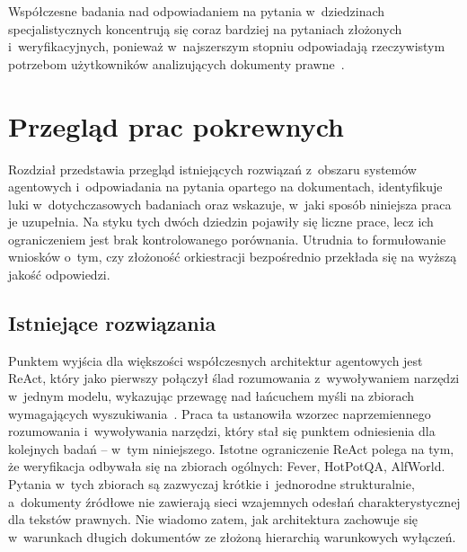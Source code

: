 Współczesne badania nad odpowiadaniem na pytania w~dziedzinach
specjalistycznych koncentrują się coraz bardziej na pytaniach złożonych
i~weryfikacyjnych, ponieważ w~najszerszym stopniu odpowiadają rzeczywistym
potrzebom użytkowników analizujących dokumenty
prawne~\cite{koreeda2021contractnli, yang2018hotpotqa}.

\section{Przegląd prac pokrewnych}\label{sec:przeglad-prac-pokrewnych}

Rozdział przedstawia przegląd istniejących rozwiązań z~obszaru systemów
agentowych i~odpowiadania na pytania opartego na dokumentach, identyfikuje luki
w~dotychczasowych badaniach oraz wskazuje, w~jaki sposób niniejsza praca je
uzupełnia. Na styku tych dwóch dziedzin pojawiły się liczne prace, lecz ich
ograniczeniem jest brak kontrolowanego porównania. Utrudnia to formułowanie
wniosków o~tym, czy złożoność orkiestracji bezpośrednio przekłada się na wyższą
jakość odpowiedzi.

\subsection{Istniejące rozwiązania}\label{subsec:istniejace-rozwiazania}

Punktem wyjścia dla większości współczesnych architektur agentowych jest ReAct,
który jako pierwszy połączył ślad rozumowania z~wywoływaniem narzędzi w~jednym
modelu, wykazując przewagę nad łańcuchem myśli na zbiorach wymagających
wyszukiwania~\cite{yao2022react}. Praca ta ustanowiła wzorzec naprzemiennego
rozumowania i~wywoływania narzędzi, który stał się punktem odniesienia dla
kolejnych badań -- w~tym niniejszego. Istotne ograniczenie ReAct polega na tym,
że weryfikacja odbywała się na zbiorach ogólnych: Fever, HotPotQA, AlfWorld.
Pytania w~tych zbiorach są zazwyczaj krótkie i~jednorodne strukturalnie,
a~dokumenty źródłowe nie zawierają sieci wzajemnych odesłań charakterystycznej
dla tekstów prawnych. Nie wiadomo zatem, jak architektura zachowuje się
w~warunkach długich dokumentów ze złożoną hierarchią warunkowych wyłączeń.

